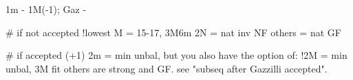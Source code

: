 1m - 1M(-1); Gaz - 

# if not accepted
!lowest M = 15-17, 3M6m
2N = nat inv NF
others = nat GF

# if accepted (+1)
2m = min unbal, but you also have the option of:
!2M = min unbal, 3M fit
others are strong and GF. see "subseq after Gazzilli accepted".
